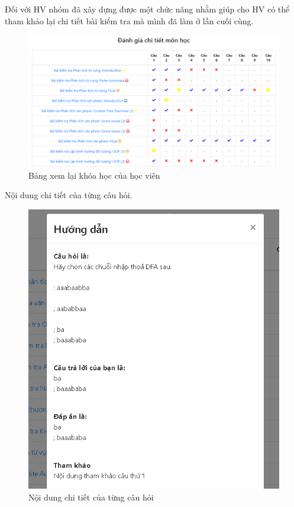 Đối với HV nhóm đã xây dựng được một chức năng nhằm giúp cho HV có thể tham khảo lại chi tiết bài kiểm tra mà mình đã làm ở lần cuối cùng.

\begin{center}
	\begin{figure}[htp]
		\begin{center}
			\includegraphics[width=0.8\linewidth]{img/33}
		\end{center}
		\caption{Bảng xem lại khóa học của học viên}
		\label{refhinh77}
	\end{figure}
\end{center}

Nội dung chi tiết của từng câu hỏi.

\begin{center}
	\begin{figure}[htp]
		\begin{center}
			\includegraphics[width=0.5\linewidth]{img/34}
		\end{center}
		\caption{Nội dung chi tiết của từng câu hỏi}
		\label{refhinh78}
	\end{figure}
\end{center}
